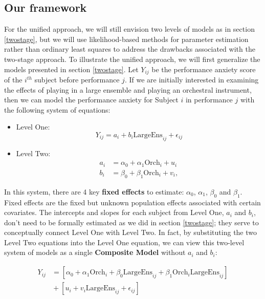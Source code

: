 \documentclass[
]{krantz}
\providecommand{\tightlist}{%
  \setlength{\itemsep}{0pt}\setlength{\parskip}{0pt}}
\begin{document}
\hypertarget{ourframework}{%
\subsection{Our framework}\label{ourframework}}

For the unified approach, we will still envision two levels of models as in section \ref{twostage}, but we will use likelihood-based methods for parameter estimation rather than ordinary least squares to address the drawbacks associated with the two-stage approach. To illustrate the unified approach, we will first generalize the models presented in section \ref{twostage}. Let \(Y_{ij}\) be the performance anxiety score of the \(i^{th}\) subject before performance \(j\). If we are initially interested in examining the effects of playing in a large ensemble and playing an orchestral instrument, then we can model the performance anxiety for Subject \(i\) in performance \(j\) with the following system of equations:

\begin{itemize}
\tightlist
\item
  Level One:
  \begin{equation*}
  Y_{ij} = a_{i}+b_{i}\textrm{LargeEns}_{ij}+\epsilon_{ij}
  \end{equation*}
\item
  Level Two:
  \begin{align*}
  a_{i} & = \alpha_{0}+\alpha_{1}\textrm{Orch}_{i}+u_{i} \\
  b_{i} & = \beta_{0}+\beta_{1}\textrm{Orch}_{i}+v_{i},
  \end{align*}
\end{itemize}

In this system, there are 4 key \textbf{fixed effects} to estimate: \(\alpha_{0}\), \(\alpha_{1}\), \(\beta_{0}\) and \(\beta_{1}\). Fixed effects are the fixed but unknown population effects associated with certain covariates. The intercepts and slopes for each subject from Level One, \(a_{i}\) and \(b_{i}\), don't need to be formally estimated as we did in section \ref{twostage}; they serve to conceptually connect Level One with Level Two. In fact, by substituting the two Level Two equations into the Level One equation, we can view this two-level system of models as a single \textbf{Composite Model}  without \(a_{i}\) and \(b_{i}\):

\begin{align*}
Y_{ij} & = [\alpha_{0}+\alpha_{1}\textrm{Orch}_{i}+\beta_{0}\textrm{LargeEns}_{ij}+\beta_{1}\textrm{Orch}_{i}\textrm{LargeEns}_{ij}] \\
 & \textrm{} + [u_{i}+v_{i}\textrm{LargeEns}_{ij}+\epsilon_{ij}]
\end{align*}
\end{document}
